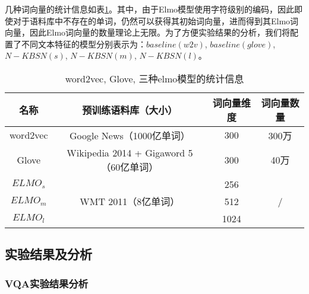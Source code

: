 几种词向量的统计信息如表\ref{embedding_compare}。其中，由于Elmo模型使用字符级别的编码，因此即使对于语料库中不存在的单词，仍然可以获得其初始词向量，进而得到其Elmo词向量，因此Elmo词向量的数量理论上无限。为了方便实验结果的分析，我们将配置了不同文本特征的模型分别表示为：$baseline(w2v)$, $baseline(glove)$, $N-KBSN(s)$, $N-KBSN(m)$, $N-KBSN(l)$。
\begin{table}[H]
\centering
\caption{word2vec, Glove, 三种elmo模型的统计信息}
\begin{tabular}{c|c|c|c}
\toprule
\textbf{名称} & \textbf{预训练语料库（大小）} & \textbf{词向量维度} & \textbf{词向量数量} \\
\midrule
word2vec&  Google News（1000亿单词）& 300&  300万\\
Glove&  Wikipedia 2014 + Gigaword 5（60亿单词）& 300&  40万\\
\midrule
$ELMO_s$&  \multirow{3}{*}{WMT 2011（8亿单词）}& 256& \multirow{3}{*}{/}\\
$ELMO_m$&  & 512&  \\
$ELMO_l$&  & 1024&  \\
\bottomrule
\end{tabular}
\label{embedding_compare}
\end{table}

\subsection{实验结果及分析}

\subsubsection{VQA实验结果分析}

